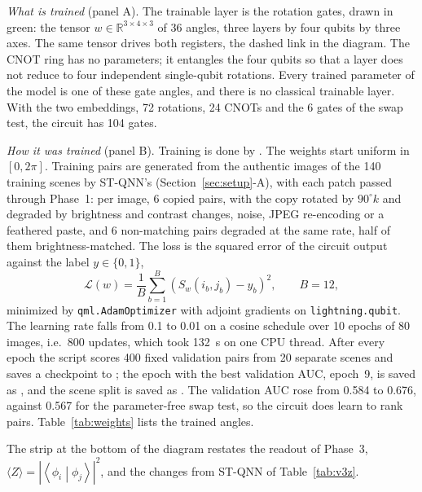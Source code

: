 \documentclass[conference]{IEEEtran}
\newcommand{\braket}[2]{\left\langle#1\middle|#2\right\rangle}
\begin{document}
\emph{What is trained} (panel A). The trainable layer is the rotation gates, drawn in green: the tensor $w\in\mathbb{R}^{3\times4\times3}$ of 36 angles, three layers by four qubits by three axes. The same tensor drives both registers, the dashed link in the diagram. The CNOT ring has no parameters; it entangles the four qubits so that a layer does not reduce to four independent single-qubit rotations. Every trained parameter of the model is one of these gate angles, and there is no classical trainable layer. With the two embeddings, 72 rotations, 24 CNOTs and the 6 gates of the swap test, the circuit has 104 gates.

\emph{How it was trained} (panel B). Training is done by . The weights start uniform in $[0,2\pi]$. Training pairs are generated from the authentic images of the 140 training scenes by ST-QNN's  (Section~\ref{sec:setup}-A), with each patch passed through Phase~1: per image, 6 copied pairs, with the copy rotated by $90^\circ k$ and degraded by brightness and contrast changes, noise, JPEG re-encoding or a feathered paste, and 6 non-matching pairs degraded at the same rate, half of them brightness-matched. The loss is the squared error of the circuit output against the label $y\in\{0,1\}$,
\begin{equation}
\mathcal{L}(w) = \frac{1}{B}\sum_{b=1}^{B}\left(S_w(i_b,j_b) - y_b\right)^2, \qquad B = 12,
\label{eq:zloss}
\end{equation}
minimized by \texttt{qml.AdamOptimizer} with adjoint gradients on \texttt{lightning.qubit}. The learning rate falls from 0.1 to 0.01 on a cosine schedule over 10 epochs of 80 images, i.e.\ 800 updates, which took 132~s on one CPU thread. After every epoch the script scores 400 fixed validation pairs from 20 separate scenes and saves a checkpoint to ; the epoch with the best validation AUC, epoch~9, is saved as , and the scene split is saved as . The validation AUC rose from 0.584 to 0.676, against 0.567 for the parameter-free swap test, so the circuit does learn to rank pairs. Table~\ref{tab:weights} lists the trained angles.

The strip at the bottom of the diagram restates the readout of Phase~3, $\langle Z\rangle = |\braket{\phi_i}{\phi_j}|^2$, and the changes from ST-QNN of Table~\ref{tab:v3z}.
\end{document}
